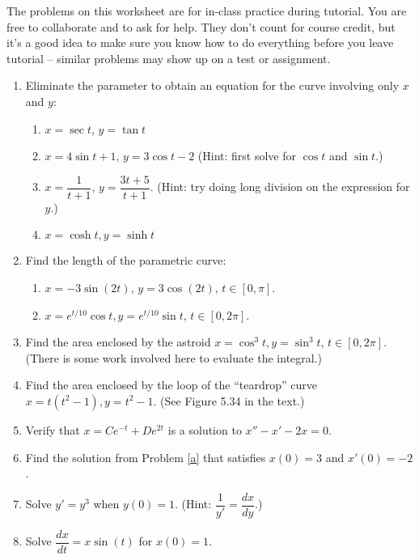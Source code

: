 \documentclass[12pt]{article}
\begin{document}
\thispagestyle{fancy}
The problems on this worksheet are for in-class practice during tutorial. You are free to collaborate and to ask for help. They don't count for course credit, but it's a good idea to make sure you know how to do everything before you leave tutorial -- similar problems may show up on a test or assignment.

\begin{enumerate}
 \item Eliminate the parameter to obtain an equation for the curve involving only $x$ and $y$:
\begin{enumerate}
 \item $x=\sec t$, $y=\tan t$
 \item $x=4\sin t+1$, $y=3\cos t-2$ (Hint: first solve for $\cos t$ and $\sin t$.)
 \item $x=\dfrac{1}{t+1}$, $y=\dfrac{3t+5}{t+1}$. (Hint: try doing long division on the expression for $y$.)
 \item $x=\cosh t, y=\sinh t$
\end{enumerate}
 
 \item Find the length of the parametric curve:
\begin{enumerate}
 \item $x=-3\sin(2t)$, $y=3\cos(2t)$, $t\in [0,\pi]$.
 \item $x=e^{t/10}\cos t, y=e^{t/10}\sin t$, $t\in [0,2\pi]$.
\end{enumerate}
 \item Find the area enclosed by the astroid $x=\cos^3 t, y=\sin^3 t$, $t\in [0,2\pi]$. (There is some work involved here to evaluate the integral.)
 \item Find the area enclosed by the loop of the ``teardrop'' curve $x=t(t^2-1), y=t^2-1$. (See Figure 5.34 in the text.)

 \item Verify that $x=Ce^{-t}+De^{2t}$ is a solution to $x''-x'-2x=0$.\label{a}
 \item Find the solution from Problem \ref{a} that satisfies $x(0)=3$ and $x'(0)=-2$.
 \item Solve $y'=y^3$ when $y(0)=1$. (Hint: $\dfrac{1}{y'} = \dfrac{dx}{dy}$.)
 \item Solve $\dfrac{dx}{dt} = x\sin(t)$ for $x(0)=1$.


\end{enumerate}
\end{document}
